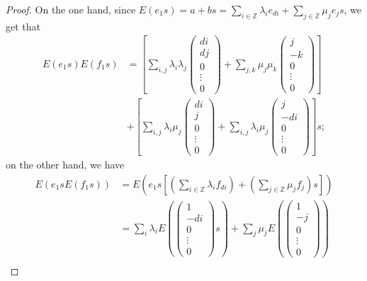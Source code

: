 \documentclass[12pt]{amsart}
\theoremstyle{definition}
\theoremstyle{remark}
\begin{document}
\begin{proof}
On the one hand, since
$E(e_1s)=a+bs=\sum_{i\in\mathbb{Z}}\lambda_ie_{di}+\sum_{j\in\mathbb{Z}}\mu_je_js$, we get that
\begin{align*}
E(e_1s)E(f_1s)&=\left[\sum_{i, j}\lambda_i\lambda_j\left(\begin{smallmatrix}
di\\
dj\\
0\\
\vdots\\
0
\end{smallmatrix}\right)+\sum_{j, k}\mu_j\mu_k\left(\begin{smallmatrix}
j\\
-k\\
0\\
\vdots\\
0
\end{smallmatrix}\right)\right]\\
&+\left[\sum_{i,j}\lambda_i\mu_j\left(\begin{smallmatrix}
di\\
j\\
0\\
\vdots\\
0
\end{smallmatrix}\right)+\sum_{i, j}\lambda_i\mu_j\left(\begin{smallmatrix}
j\\
-di\\
0\\
\vdots\\
0
\end{smallmatrix}\right)\right]s;
\end{align*}
on the other hand, we have
\begin{align*}
E(e_1sE(f_1s))&=E(e_{1}s\left[(\sum_{i\in\mathbb{Z}}\lambda_if_{di})+(\sum_{j\in\mathbb{Z}}\mu_jf_j)s\right])\\
&=\sum_i\lambda_iE(\left(\begin{smallmatrix}
1\\
-di\\
0\\
\vdots\\
0
\end{smallmatrix}\right)s)+\sum_j\mu_jE(\left(\begin{smallmatrix}
1\\
-j\\
0\\
\vdots\\
0
\end{smallmatrix}\right))\\

\end{align*}
\end{proof}
\end{document}

